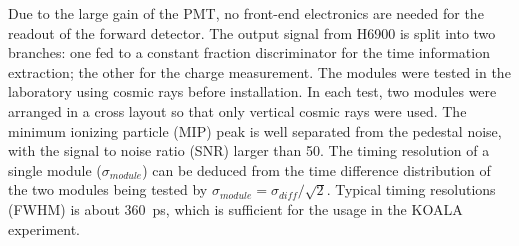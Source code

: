 \documentclass[number,5p]{elsarticle}
\begin{document}
Due to the large gain of the PMT, no front-end electronics are needed for the readout of the forward detector.
The output signal from H6900 is split into two branches: one fed to a
constant fraction discriminator for the time information extraction; the other
for the charge measurement.
The modules were tested in the laboratory using cosmic rays before installation.
In each test, two modules were arranged in a cross layout so that only vertical
cosmic rays were used.
The minimum ionizing particle (MIP) peak is well separated from the pedestal
noise, with the signal to noise ratio (SNR) larger than 50.
The timing resolution of a single module ($\sigma_{module}$) can be deduced from
the time difference distribution of the two modules being tested by $\sigma_{module}=\sigma_{diff}/\sqrt{2}$.
Typical timing resolutions (FWHM) is about \SI{360}{\pico\second}, which is
sufficient for the usage in the KOALA experiment.
\end{document}
